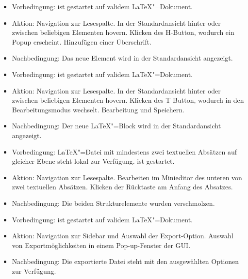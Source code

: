 \begin{itemize}
  \item Vorbedingung: \texla{} ist gestartet auf validem \LaTeX"=Dokument.
  \item Aktion: Navigation zur Lesespalte.
  In der Standardansicht hinter oder zwischen beliebigen Elementen hovern.
  Klicken des H-Button, wodurch ein Popup erscheint.
  Hinzufügen einer Überschrift.
  \item Nachbedingung: Das neue Element wird in der Standardansicht angezeigt.
\end{itemize}

\begin{itemize}
  \item Vorbedingung: \texla{} ist gestartet auf validem \LaTeX"=Dokument.
  \item Aktion: Navigation zur Lesespalte.
  In der Standardansicht hinter oder zwischen beliebigen Elementen hovern.
  Klicken des T-Button, wodurch \texla{} in den Bearbeitungsmodus wechselt.
  Bearbeitung und Speichern.
  \item Nachbedingung: Der neue \LaTeX"=Block wird in der Standardansicht angezeigt.
\end{itemize}

\begin{itemize}
  \item Vorbedingung: \LaTeX"=Datei mit mindestens zwei textuellen Absätzen auf gleicher Ebene steht lokal zur
  Verfügung.
  \texla{} ist gestartet.
  \item Aktion: Navigation zur Lesespalte.
  Bearbeiten im Minieditor des unteren von zwei textuellen Absätzen.
  Klicken der Rücktaste am Anfang des Absatzes.
  \item Nachbedingung: Die beiden Strukturelemente wurden verschmolzen.
\end{itemize}

\clearpage

\begin{itemize}
  \item Vorbedingung: \texla{} ist gestartet auf validem \LaTeX"=Dokument.
  \item Aktion: Navigation zur Sidebar und Auswahl der Export-Option.
  Auswahl von Exportmöglichkeiten in einem Pop-up-Fenster der GUI.
  \item Nachbedingung: Die exportierte Datei steht mit den ausgewählten Optionen zur Verfügung.
\end{itemize}

